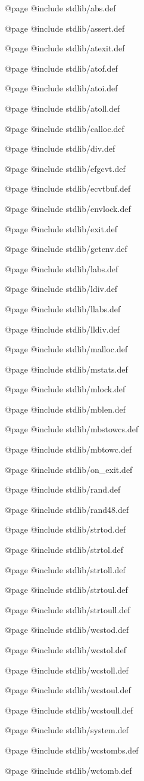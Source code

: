 @page
@include stdlib/abs.def

@page
@include stdlib/assert.def

@page
@include stdlib/atexit.def

@page
@include stdlib/atof.def

@page
@include stdlib/atoi.def

@page
@include stdlib/atoll.def

@page
@include stdlib/calloc.def

@page
@include stdlib/div.def

@page
@include stdlib/efgcvt.def

@page
@include stdlib/ecvtbuf.def

@page
@include stdlib/envlock.def

@page
@include stdlib/exit.def

@page
@include stdlib/getenv.def

@page
@include stdlib/labs.def

@page
@include stdlib/ldiv.def

@page
@include stdlib/llabs.def

@page
@include stdlib/lldiv.def

@page
@include stdlib/malloc.def

@page
@include stdlib/mstats.def

@page
@include stdlib/mlock.def

@page
@include stdlib/mblen.def

@page
@include stdlib/mbstowcs.def

@page
@include stdlib/mbtowc.def

@page
@include stdlib/on_exit.def

@page
@include stdlib/rand.def

@page
@include stdlib/rand48.def

@page
@include stdlib/strtod.def

@page
@include stdlib/strtol.def

@page
@include stdlib/strtoll.def

@page
@include stdlib/strtoul.def

@page
@include stdlib/strtoull.def

@page
@include stdlib/wcstod.def

@page
@include stdlib/wcstol.def

@page
@include stdlib/wcstoll.def

@page
@include stdlib/wcstoul.def

@page
@include stdlib/wcstoull.def

@page
@include stdlib/system.def

@page
@include stdlib/wcstombs.def

@page
@include stdlib/wctomb.def

